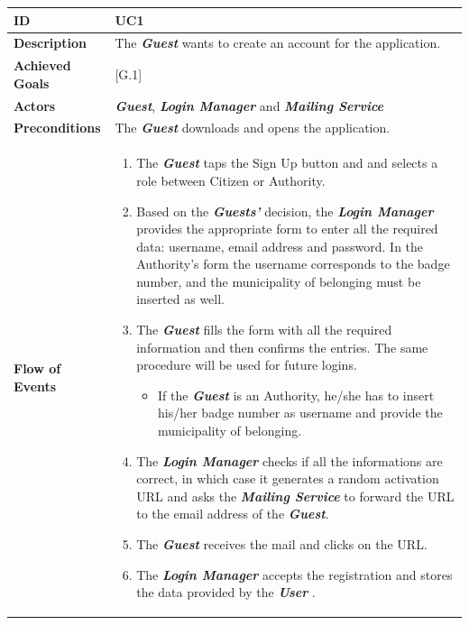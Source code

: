 \documentclass{report}
\begin{document}
\begin{tabularx}{\linewidth}{| l | X |}
	\hline
	\textbf{ID} & UC1\\
	
	\hline
	\textbf{Description} & The \textbf{\textit{Guest}} wants to create an account for the application.\\
	
	\hline
	\textbf{Achieved Goals} & {[G.1]}\\

	\hline
	\textbf{Actors} & \textbf{\textit{Guest}}, \textbf{\textit{Login Manager}} and \textbf{\textit{Mailing Service}}\\
	
	\hline
	\textbf{Preconditions} & The \textbf{\textit{Guest}} downloads and opens the application.\\
	
	\hline
	\textbf{Flow of Events} & \parbox{0.7\textwidth}{	
		\begin{enumerate}
			\item The \textbf{\textit{Guest}} taps the Sign Up button and and selects a role between Citizen or Authority.
			\item Based on the \textbf{\textit{Guests'}} decision, the \textbf{\textit{Login Manager}} provides the appropriate form to enter all the required data: username, email address and password. In the Authority's form the username corresponds to the badge number, and the municipality of belonging must be inserted as well. 
			\item The \textbf{\textit{Guest}} fills the form with all the required information and then confirms the entries. The same procedure will be used for future logins.
			\begin{itemize}
				\item If the \textbf{\textit{Guest}} is an Authority, he/she has to insert his/her badge number as username and provide the municipality of belonging.
			\end{itemize}	
			\item The \textbf{\textit{Login Manager}} checks if all the informations are correct, in which case it generates a random activation
			URL and asks the \textbf{\textit{Mailing Service}} to forward the URL to the email address of the \textbf{\textit{Guest}}.
			\item The \textbf{\textit{Guest}} receives the mail and clicks on the URL. \item The \textbf{\textit{Login Manager}} accepts the registration and stores the data provided by the \textbf{\textit{User}} .
	\end{enumerate}}\\
	

\end{tabularx}
\end{document}
